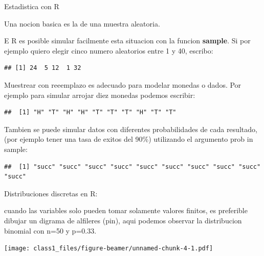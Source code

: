 \documentclass[ignorenonframetext,]{beamer}
\begin{document}
\begin{frame}[fragile]{Estadistica con R}

Una nocion basica es la de una muestra aleatoria.

E R es posible simular facilmente esta situacion con la funcion
\textbf{sample}. Si por ejemplo quiero elegir cinco numero aleatorios
entre 1 y 40, escribo:

\begin{verbatim}
## [1] 24  5 12  1 32
\end{verbatim}

Muestrear con reeemplazo es adecuado para modelar monedas o dados. Por
ejemplo para simular arrojar diez monedas podemos escribir:

\begin{verbatim}
##  [1] "H" "T" "H" "H" "T" "T" "T" "H" "T" "T"
\end{verbatim}

Tambien se puede simular datos con diferentes probabilidades de cada
resultado, (por ejemplo tener una tasa de exitos del 90\%) utilizando el
argumento prob in sample:

\begin{verbatim}
##  [1] "succ" "succ" "succ" "succ" "succ" "succ" "succ" "succ" "succ" "succ"
\end{verbatim}

\end{frame}

\begin{frame}{Distribuciones discretas en R:}

cuando las variables solo pueden tomar solamente valores finitos, es
preferible dibujar un digrama de alfileres (pin), aqui podemos observar
la distribucion binomial con n=50 y p=0.33.

\texttt{[image: class1\_files/figure-beamer/unnamed-chunk-4-1.pdf]}

\end{frame}
\end{document}
